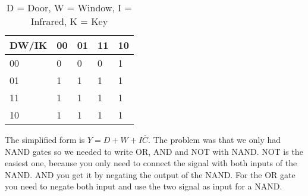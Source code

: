 \begin{table}[]
\centering
\caption{D = Door, W = Window, I = Infrared, K = Key}
\label{my-label}
\begin{tabular}{lllll}
\hline
 DW/IK & 00 & 01 & 11 & 10 \\ \hline
 00    & 0  & 0  & 0  & 1 \\
 01    & 1  & 1  & 1  & 1 \\
 11    & 1  & 1  & 1  & 1 \\ 
 10    & 1  & 1  & 1  & 1 \\ \hline
\end{tabular}
\end{table}

The simplified form is $Y = D + W + I\overline{C}$. The problem was that we only had NAND gates so we needed to write OR, AND and NOT with NAND. NOT is the easiest one, because you only need to connect the signal with both inputs of the NAND. AND you get it by negating the output of the NAND. For the OR gate you need to negate both input and use the two signal as input  for a NAND.

